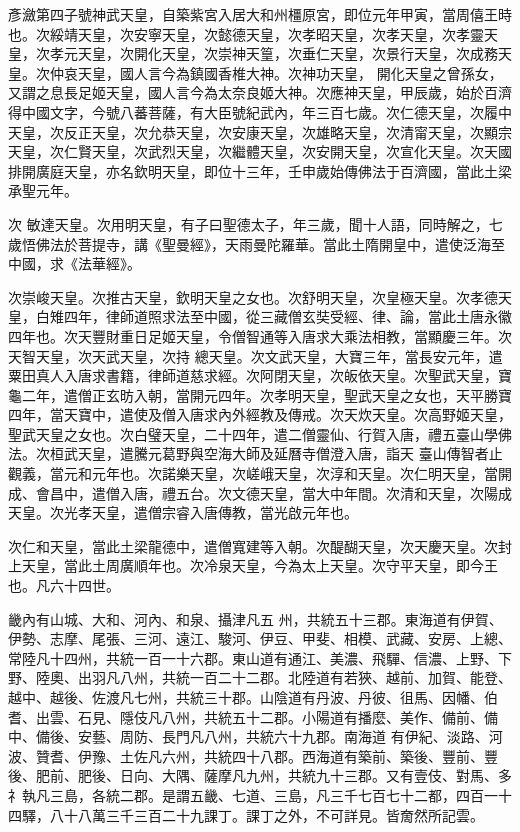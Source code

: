 \begin{pinyinscope}
 彥瀲第四子號神武天皇，自築紫宮入居大和州橿原宮，即位元年甲寅，當周僖王時也。次綏靖天皇，次安寧天皇，次懿德天皇，次孝昭天皇，次孝天皇，次孝靈天皇，次孝元天皇，次開化天皇，次崇神天篁，次垂仁天皇，次景行天皇，次成務天皇。次仲哀天皇，國人言今為鎮國香椎大神。次神功天皇，
 開化天皇之曾孫女，又謂之息長足姬天皇，國人言今為太奈良姬大神。次應神天皇，甲辰歲，始於百濟得中國文字，今號八蕃菩薩，有大臣號紀武內，年三百七歲。次仁德天皇，次履中天皇，次反正天皇，次允恭天皇，次安康天皇，次雄略天皇，次清甯天皇，次顯宗天皇，次仁賢天皇，次武烈天皇，次繼體天皇，次安開天皇，次宣化天皇。次天國排開廣庭天皇，亦名欽明天皇，即位十三年，壬申歲始傳佛法于百濟國，當此土梁承聖元年。



 次
 敏達天皇。次用明天皇，有子曰聖德太子，年三歲，聞十人語，同時解之，七歲悟佛法於菩提寺，講《聖曼經》，天雨曼陀羅華。當此土隋開皇中，遣使泛海至中國，求《法華經》。



 次崇峻天皇。次推古天皇，欽明天皇之女也。次舒明天皇，次皇極天皇。次孝德天皇，白雉四年，律師道照求法至中國，從三藏僧玄奘受經、律、論，當此土唐永徽四年也。次天豐財重日足姬天皇，令僧智通等入唐求大乘法相教，當顯慶三年。次天智天皇，次天武天皇，次持
 總天皇。次文武天皇，大寶三年，當長安元年，遣粟田真人入唐求書籍，律師道慈求經。次阿閉天皇，次皈依天皇。次聖武天皇，寶龜二年，遣僧正玄昉入朝，當開元四年。次孝明天皇，聖武天皇之女也，天平勝寶四年，當天寶中，遣使及僧入唐求內外經教及傳戒。次天炊天皇。次高野姬天皇，聖武天皇之女也。次白璧天皇，二十四年，遣二僧靈仙、行賀入唐，禮五臺山學佛法。次桓武天皇，遣騰元葛野與空海大師及延曆寺僧澄入唐，詣天
 臺山傳智者止觀義，當元和元年也。次諾樂天皇，次嵯峨天皇，次淳和天皇。次仁明天皇，當開成、會昌中，遣僧入唐，禮五台。次文德天皇，當大中年間。次清和天皇，次陽成天皇。次光孝天皇，遣僧宗睿入唐傳教，當光啟元年也。



 次仁和天皇，當此土梁龍德中，遣僧寬建等入朝。次醍醐天皇，次天慶天皇。次封上天皇，當此土周廣順年也。次冷泉天皇，今為太上天皇。次守平天皇，即今王也。凡六十四世。



 畿內有山城、大和、河內、和泉、攝津凡五
 州，共統五十三郡。東海道有伊賀、伊勢、志摩、尾張、三河、遠江、駿河、伊豆、甲斐、相模、武藏、安房、上總、常陸凡十四州，共統一百一十六郡。東山道有通江、美濃、飛驒、信濃、上野、下野、陸奧、出羽凡八州，共統一百二十二郡。北陸道有若狹、越前、加賀、能登、越中、越後、佐渡凡七州，共統三十郡。山陰道有丹波、丹彼、徂馬、因幡、伯耆、出雲、石見、隱伎凡八州，共統五十二郡。小陽道有播麼、美作、備前、備中、備後、安藝、周防、長門凡八州，共統六十九郡。南海道
 有伊紀、淡路、河波、贊耆、伊豫、土佐凡六州，共統四十八郡。西海道有築前、築後、豐前、豐後、肥前、肥後、日向、大隅、薩摩凡九州，共統九十三郡。又有壹伎、對馬、多礻執凡三島，各統二郡。是謂五畿、七道、三島，凡三千七百七十二都，四百一十四驛，八十八萬三千三百二十九課丁。課丁之外，不可詳見。皆奝然所記雲。




\end{pinyinscope}
